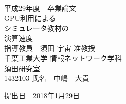 \documentclass[a4j,12pt]{jsarticle}
\begin{document}
\fontsize{20pt}{15pt}\selectfont

\thispagestyle{empty} %

\begin{center}
\huge
{}
平成29年度　卒業論文\\[50pt]
\HUGE
GPU利用による\\
シミュレータ教材の\\
演算速度\\
\huge
{}
指導教員　須田 宇宙 准教授\\[40pt]
千葉工業大学 情報ネットワーク学科\\[10pt]
須田研究室\\[60pt]
1432103 \hspace{50pt} 氏名　中嶋　大貴\\[75pt]
\end{center}

\begin{flushright} 
\huge
提出日　2018年1月29日
\end{flushright}

\newpage
\thispagestyle{empty} %
%

\fontsize{10pt}{15pt}\selectfont

\setcounter{page}{1} %
\setcounter{tocdepth}{3}

\newpage
\tableofcontents


\newpage
\listoffigures

\newpage
\listoftables




\newpage
{}
\setcounter{page}{1} %


\newpage


\newpage


\newpage


\newpage


\newpage


\newpage


\newpage


\newpage

\end{document}
